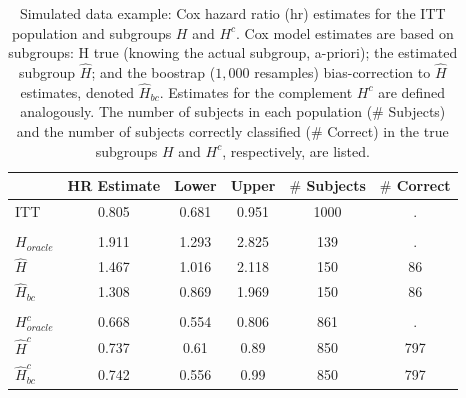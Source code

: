 \documentclass[smallextended]{svjour3}
\begin{document}
\begin{table}

\caption{\label{tab:simex_tab}\label{tab:simex} Simulated data example: Cox hazard ratio (hr) estimates for the ITT population and subgroups $H$ and $H^{c}$.
Cox model estimates are based on subgroups: H true (knowing the actual subgroup, a-priori); the estimated subgroup $\hat{H}$; and 
the boostrap ($1,000$ resamples) bias-correction to $\hat{H}$ estimates, denoted $\hat{H}_{bc}$.  Estimates for the complement $H^{c}$ are defined analogously.
The number of subjects in each population ($\#$ Subjects) and the number of subjects correctly classified ($\#$ Correct) in the true subgroups $H$ and $H^{c}$, respectively, are listed.}
\centering
\fontsize{9}{11}\selectfont
\begin{tabular}[t]{lccccc}
\toprule
  & HR Estimate & Lower & Upper & $\#$ Subjects & $\#$ Correct\\
\midrule
ITT & 0.805 & 0.681 & 0.951 & 1000 & .\\
\addlinespace[0.3em]
\multicolumn{6}{l}{\textbf{H subgroup estimates}}\\
\hspace{1em}$H_{oracle}$ & 1.911 & 1.293 & 2.825 & 139 & .\\
\hspace{1em}$\hat{H}$ & 1.467 & 1.016 & 2.118 & 150 & 86\\
\hspace{1em}$\hat{H}_{bc}$ & 1.308 & 0.869 & 1.969 & 150 & 86\\
\addlinespace[0.3em]
\multicolumn{6}{l}{\textbf{H-complement subgroup estimates}}\\
\hspace{1em}$H^{c}_{oracle}$ & 0.668 & 0.554 & 0.806 & 861 & .\\
\hspace{1em}$\hat{H}^{c}$ & 0.737 & 0.61 & 0.89 & 850 & 797\\
\hspace{1em}$\hat{H}^{c}_{bc}$ & 0.742 & 0.556 & 0.99 & 850 & 797\\
\bottomrule
\end{tabular}
\end{table}





\end{document}

